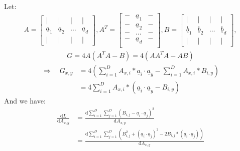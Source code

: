 \documentclass[11pt,letterpaper]{article}
\begin{document}
\begin{enumerate}
\begin{enumerate}
    Let:
    \begin{align*}
         A = \begin{bmatrix}
                         | & | & | & | \\
                         \underline a_1 & \underline a_2 & \dots & \underline a_d\\
                         | & | & | & |
                    \end{bmatrix}, 
        A^T = \begin{bmatrix}
                         - & \underline a_1 & -\\
                         - & \underline a_2 & -\\
                         - & \dots & -\\
                         - & \underline a_d & -\\
                    \end{bmatrix}, 
        B = \begin{bmatrix}
                         | & | & | & | \\
                         \underline b_1 & \underline b_2 & \dots & \underline b_d\\
                         | & | & | & |
                    \end{bmatrix}, 
    \end{align*}
    \begin{align*}
         G = 4A(A^TA-B) = 4(AA^TA-AB)
    \end{align*}
    \begin{align*}
         \Rightarrow \quad G_{x,y} &= 4(\sum_{i=1}^D{
            A_{x,i}*\underline a_i \cdot \underline a_y}
            - \sum_{i=1}^D{
            A_{x,i}* B_{i,y}}
            )\\
            &=4\sum_{i=1}^D{
            A_{x,i}*(\underline a_i \cdot \underline a_y-B_{i,y})}
    \end{align*}
    And we have:
    \begin{align*}
         \frac{\mathrm{d} L}{\mathrm{d} A_{x,y}} &= \frac{
            \mathrm{d} \sum_{i=1}^D \sum_{j=1}^D
            (B_{i,j} - \underline a_i \cdot \underline a_j)^2
         }{
            \mathrm{d} A_{x,y}
         }    \\
         &= \frac{
            \mathrm{d} \sum_{i=1}^D \sum_{j=1}^D
            (B_{i,j}^2 + (\underline a_i \cdot \underline a_j)^2 - 2B_{i,j}*(\underline a_i \cdot \underline a_j))
         }{
            \mathrm{d} A_{x,y}
         }\\

\end{align*}
\end{enumerate}
\end{enumerate}
\end{document}

